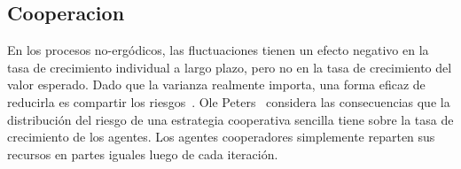 \documentclass[a4paper,10pt]{article}
\begin{document}
% 

\subsection{Cooperacion}

En los procesos no-ergódicos, las fluctuaciones tienen un efecto negativo en la tasa de crecimiento individual a largo plazo, pero no en la tasa de crecimiento del valor esperado.
Dado que la varianza realmente importa, una forma eficaz de reducirla es compartir los riesgos~\cite{yaari2010-cooperationEvolution, peters2015-evolutionaryAdvantageOfCooperation}.
Ole Peters~\cite{peters2015-evolutionaryAdvantageOfCooperation} considera las consecuencias que la distribución del riesgo de una estrategia cooperativa sencilla tiene sobre la tasa de crecimiento de los agentes.
Los agentes cooperadores simplemente reparten sus recursos en partes iguales luego de cada iteración.
\end{document}

